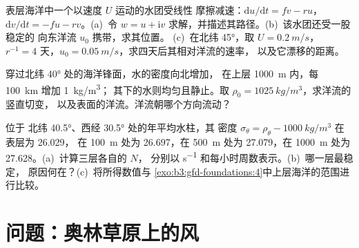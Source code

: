\begin{exercise}[$\star\star\star$]\label{exo:b3:gfd-foundations:10}
表层海洋中一个以速度 $U$ 运动的水团受线性
摩擦减速：$\mathrm du/\mathrm dt = fv - ru$，$\mathrm dv/\mathrm dt = -fu -
rv$。(a)~令 $w = u + \mathrm iv$ 求解，并描述其路径。(b)~该水团还受一股稳定的
向东洋流 $u_0$ 携带，求其位置。
(c)~在北纬 \ang{45}，取 $U = \qty{0.2}{m/s}$，$r^{-1} =
\num{4}\text{ 天}$，$u_0 = \qty{0.05}{m/s}$，求四天后其相对洋流的速率，
以及它漂移的距离。
\end{exercise}

\begin{exercise}[$\star\star\star$]\label{exo:b3:gfd-foundations:11}
穿过北纬 \ang{40} 处的海洋锋面，水的密度向北增加，
在上层 \qty{1000}{m} 内，每 \qty{100}{km} 增加 \qty{1}{kg/m^3}；
其下的水则均匀且静止。取 $\rho_0 =
\qty{1025}{kg/m^3}$，求洋流的竖直切变，
以及表面的洋流。洋流朝哪个方向流动？
\end{exercise}

\begin{exercise}[$\star\star\star$]\label{exo:b3:gfd-foundations:12}
位于 北纬 \ang{40.5}、西经 \ang{30.5} 处的年平均水柱，其
密度 $\sigma_\theta = \rho_\theta - \qty{1000}{kg/m^3}$ 在表层为 26.029，
在 \qty{100}{m} 处为 26.697，在 \qty{500}{m} 处为 27.079，在
\qty{1000}{m} 处为 27.628。(a)~计算三层各自的 $N$，
分别以 \unit{s^{-1}} 和每小时周数表示。(b)~哪一层最稳定，
原因何在？(c)~将所得数值与
\cref{exo:b3:gfd-foundations:4}中上层海洋的范围进行比较。
\end{exercise}

\section{问题：奥林草原上的风}

